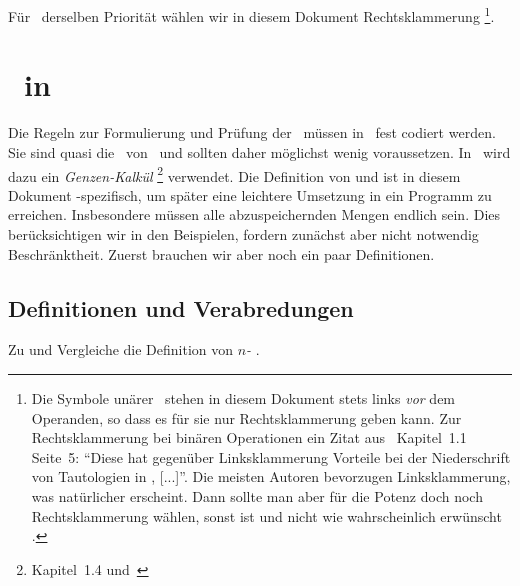 Für \Operationen\ derselben Priorität wählen wir in diesem Dokument Rechtsklammerung%
\footnote{%
	Die Symbole unärer \Operationen\ stehen in diesem Dokument stets links \emph{vor} dem Operanden, so dass es für sie nur Rechtsklammerung geben kann.
	Zur Rechtsklammerung bei binären Operationen ein Zitat aus~\cite{bib:Rautenberg} Kapitel~1.1 Seite~5:
	"`Diese hat gegenüber Linksklammerung Vorteile bei der Niederschrift von Tautologien in \OjkImp, [...]"'.
	Die meisten Autoren bevorzugen Linksklammerung, was natürlicher erscheint.
	Dann sollte man aber für die Potenz doch noch Rechtsklammerung wählen, sonst ist  und nicht wie wahrscheinlich erwünscht .
}.

\section[Beweise in ASBA]{\Beweise\ in \ASBA}%
\label                {sec-BeweiseASBA}

Die Regeln zur Formulierung und Prüfung der \Beweise\ müssen in \ASBA\ fest codiert werden.
Sie sind quasi die \Axiome\ von \ASBA\ und sollten daher möglichst wenig voraussetzen.
In \ASBA\ wird dazu ein \emph{Genzen-Kalkül}%
\footnote{%
	 Kapitel~1.4 und~\cite{bib:Schlussregel,bib:NatuerlichesSchliessen}
} verwendet.
Die Definition von \emph{\Schlussregel} und \emph{\Beweis} ist in diesem Dokument \ASBA-spezifisch, um später eine leichtere Umsetzung in ein Programm zu erreichen.
Insbesondere müssen alle abzuspeichernden Mengen endlich sein.
Dies berücksichtigen wir in den Beispielen, fordern zunächst aber nicht notwendig Beschränktheit.
Zuerst brauchen wir aber noch ein paar Definitionen.

\subsection{Definitionen und Verabredungen}%
\label                  {sub-Verabredungen}

Zu \chrqt{\MtsLen} und \chrqt{\MtsSet} Vergleiche die Definition von \emph{$n$-\Tupel} .

